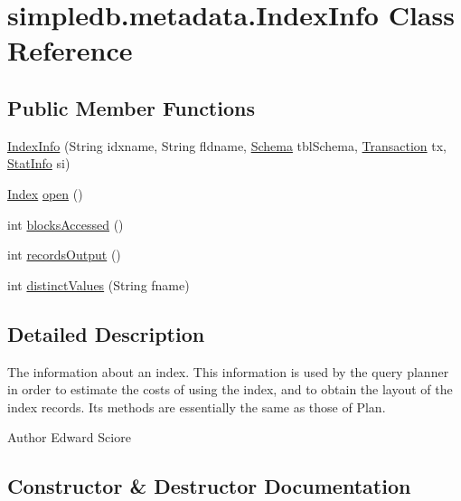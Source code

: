 \hypertarget{classsimpledb_1_1metadata_1_1IndexInfo}{}\section{simpledb.\+metadata.\+Index\+Info Class Reference}
\label{classsimpledb_1_1metadata_1_1IndexInfo}
\subsection*{Public Member Functions}
\begin{DoxyCompactItemize}
\item 
\hyperlink{classsimpledb_1_1metadata_1_1IndexInfo_a707aa070db904f077613798734bf5ae3}{Index\+Info} (String idxname, String fldname, \hyperlink{classsimpledb_1_1record_1_1Schema}{Schema} tbl\+Schema, \hyperlink{classsimpledb_1_1tx_1_1Transaction}{Transaction} tx, \hyperlink{classsimpledb_1_1metadata_1_1StatInfo}{Stat\+Info} si)
\item 
\hyperlink{interfacesimpledb_1_1index_1_1Index}{Index} \hyperlink{classsimpledb_1_1metadata_1_1IndexInfo_a09f79392e6b84590a29d0d802e958c72}{open} ()
\item 
int \hyperlink{classsimpledb_1_1metadata_1_1IndexInfo_a0f2e0f9783093798b3c1d4e6a613a105}{blocks\+Accessed} ()
\item 
int \hyperlink{classsimpledb_1_1metadata_1_1IndexInfo_aa262013b08ce555a6c63ff1cbb2899d1}{records\+Output} ()
\item 
int \hyperlink{classsimpledb_1_1metadata_1_1IndexInfo_a1fa2fc27f1a58d44dff16d1689cf73e9}{distinct\+Values} (String fname)
\end{DoxyCompactItemize}


\subsection{Detailed Description}
The information about an index. This information is used by the query planner in order to estimate the costs of using the index, and to obtain the layout of the index records. Its methods are essentially the same as those of Plan. \begin{DoxyAuthor}{Author}
Edward Sciore 
\end{DoxyAuthor}


\subsection{Constructor \& Destructor Documentation}
\mbox{\label{classsimpledb_1_1metadata_1_1IndexInfo_a707aa070db904f077613798734bf5ae3}} 
